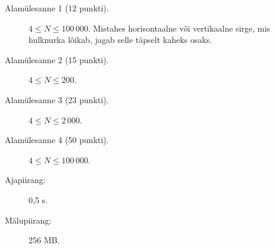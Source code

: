 \documentclass{boi2014-et}
\begin{document}
    \Scoring

    \begin{description}
        \item[Alamülesanne 1 (12 punkti).] $4 \le N \le 100\,000$.
            Mistahes horisontaalne või vertikaalne sirge, mis hulknurka lõikab,
            jagab selle täpselt kaheks osaks.
        \item[Alamülesanne 2 (15 punkti).] $4 \le N \le 200$.
        \item[Alamülesanne 3 (23 punkti).] $4 \le N \le 2\,000$.
        \item[Alamülesanne 4 (50 punkti).] $4 \le N \le 100\,000$.
    \end{description}

    \Constraints

    \begin{description}
        \item[Ajapiirang:] 0,5 s.
        \item[Mälupiirang:] 256 MB.
    \end{description}
\end{document}
